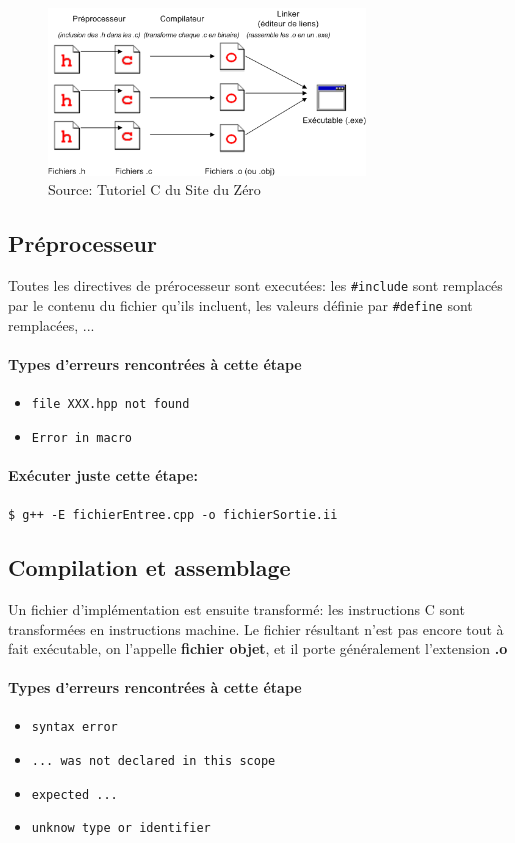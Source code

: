 \documentclass[a4paper]{article}
\begin{document}
\begin{figure}[h]
	\includegraphics[width=0.75\textwidth]{compilateur.png}
	\caption{Source: Tutoriel C du Site du Zéro}
\end{figure}

\subsection{Préprocesseur} 
Toutes les directives de prérocesseur sont executées: les \lstinline{#include} sont remplacés par le contenu du fichier qu'ils incluent, les valeurs définie par \lstinline{#define} sont remplacées, ...
\paragraph{Types d'erreurs rencontrées à cette étape} 
\begin{itemize}
	\item \texttt{file XXX.hpp not found}
	\item \texttt{Error in macro}
\end{itemize}
\paragraph{Exécuter juste cette étape:} 
\lstinline{$ g++ -E fichierEntree.cpp -o fichierSortie.ii}

\subsection{Compilation et assemblage}
Un fichier d'implémentation est ensuite transformé: les instructions C sont transformées en instructions machine. Le fichier résultant n'est pas encore tout à fait exécutable, on l'appelle \textbf{fichier objet}, et il porte généralement l'extension \textbf{.o}
\paragraph{Types d'erreurs rencontrées à cette étape}
\begin{itemize}
	\item \texttt{syntax error}
	\item \texttt{... was not declared in this scope}
	\item \texttt{expected ... }
	\item \texttt{unknow type or identifier}
\end{itemize}
\end{document}
